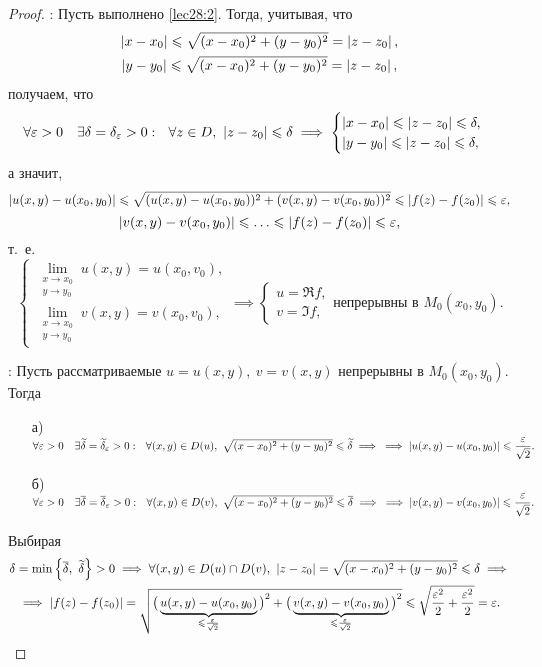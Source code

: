 \documentclass[../../main.tex]{subfiles}
\begin{document}
\begin{proof}
	\;
	
	\nec: Пусть выполнено \eqref{lec28:2}. Тогда, учитывая, что
	\[\begin{gathered}
	\left|{x - x_0}\right| \leqslant \sqrt{(x - x_0)^2 + (y - y_0)^2} = \left|{z - z_0}\right|, \\
	\left|{y - y_0}\right| \leqslant \sqrt{(x - x_0)^2 + (y - y_0)^2} = \left|{z - z_0}\right|,
	\end{gathered}\]
	получаем, что
	\[
	\forall \varepsilon > 0 \quad \exists \delta = \delta_{\varepsilon} > 0 : \ \
	\forall z \in D,\ \left|{z - z_0}\right| \leqslant \delta \implies
	\begin{cases}
		\left|{x - x_0}\right| \leqslant \left|{z - z_0}\right| \leqslant \delta, \\
		\left|{y - y_0}\right| \leqslant \left|{z - z_0}\right| \leqslant \delta,
	\end{cases}
	\]
	а значит,
	\[
	\left|{u(x, y) - u(x_0, y_0)}\right| \leqslant
	\sqrt{(u(x, y) - u(x_0, y_0))^2 + (v(x, y) - v(x_0, y_0))^2}
	\leqslant \left|{f(z) - f(z_0)}\right| \leqslant \varepsilon,
	\]
	\[
	\left|{v(x, y) - v(x_0, y_0)}\right| \leqslant \ldots \leqslant \left|{f(z) - f(z_0)}\right| \leqslant \varepsilon,
	\]
	т.~е.
	\[
	\begin{cases}
		\lim\limits_{\substack{x \to x_0\\y \to y_0}} u(x, y) = u(x_0, v_0), \\
		\lim\limits_{\substack{x \to x_0\\y \to y_0}} v(x, y) = v(x_0, v_0),
	\end{cases}
	\implies
	\begin{cases}
		u = \Re f, \\
		v = \Im f,
	\end{cases}
	\text{непрерывны в }
	M_0(x_0, y_0).
	\]
	
	\suff: Пусть рассматриваемые $u = u(x, y),\ v = v(x, y)$
	непрерывны в $M_0(x_0, y_0)$. Тогда
	\begin{enumerate}
		\item[а)] $\forall \varepsilon > 0 \quad
		\exists \widetilde{\delta} = \widetilde{\delta}_{\varepsilon} > 0 : \ \
		\forall (x, y) \in D(u),\
		\sqrt{(x - x_0)^2 + (y - y_0)^2} \leqslant \widetilde{\delta}
		\implies \\ \implies
		\left|{u(x, y) - u(x_0, y_0)}\right| \leqslant \dfrac{\varepsilon}{\sqrt{2}}.$
		\item[б)] $\forall \eps > 0 \quad
		\exists \overline{\delta} = \overline{\delta}_{\eps} > 0 : \ \
		\forall (x, y) \in D(v),\
		\sqrt{(x - x_0)^2 + (y - y_0)^2} \le \overline{\delta}
		\implies \\ \implies
		\abs{v(x, y) - v(x_0, y_0)} \le \dfrac{\eps}{\sqrt{2}}.$
	\end{enumerate}
	Выбирая
	\[\begin{gathered}
	\delta = \min \left\{\overline{\delta},\ \widetilde{\delta}\right\} > 0
	\implies \forall (x, y) \in D(u) \cap D(v),\
	\left|{z - z_0}\right| =
	\sqrt{(x - x_0)^2 + (y - y_0)^2} \leqslant \delta
	\implies \\ \implies \left|{f(z) - f(z_0)}\right| = \sqrt{
	{\big(\underbrace{u(x, y) - u(x_0, y_0)}_{\leqslant \frac{\varepsilon}{\sqrt{2}}}\big)}^2
	+
	{\big(\underbrace{v(x, y) - v(x_0, y_0)}_{\leqslant \frac{\varepsilon}{\sqrt{2}}}\big)}^2
	} \leqslant \sqrt{\frac{\varepsilon^2}{2} + \frac{\varepsilon^2}{2}} = \varepsilon.
	\end{gathered}\qedhere\]
\end{proof}
\end{document}
